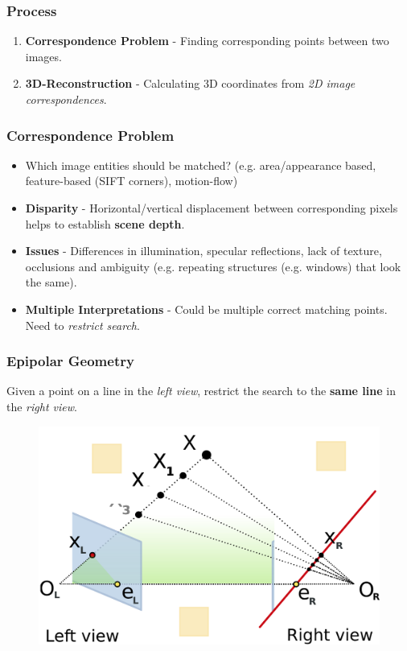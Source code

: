 \documentclass[english, 10pt]{article}
\begin{document}
\subsubsection{Process}

\begin{enumerate}
\item \textbf{Correspondence Problem} - Finding corresponding points between two images.
\item \textbf{3D-Reconstruction} - Calculating 3D coordinates from \textit{2D image correspondences}.
\end{enumerate}

\subsubsection{Correspondence Problem}

\begin{itemize}
\item Which image entities should be matched? (e.g. area/appearance based, feature-based (SIFT corners), motion-flow)
\item \textbf{Disparity} - Horizontal/vertical displacement between corresponding pixels helps to establish \textbf{scene depth}.
\item \textbf{Issues} - Differences in illumination, specular reflections, lack of texture, occlusions and ambiguity (e.g. repeating structures (e.g. windows) that look the same).
\item \textbf{Multiple Interpretations} - Could be multiple correct matching points. Need to \textit{restrict search}. 
\end{itemize}

\subsubsection{Epipolar Geometry}

Given a point on a line in the \textit{left view}, restrict the search to the \textbf{same line} in the \textit{right view}. 

\begin{figure}[ht!]      
	\centering 
	\includegraphics[scale=0.25]{epipolar.png}
\end{figure}
\end{document}
